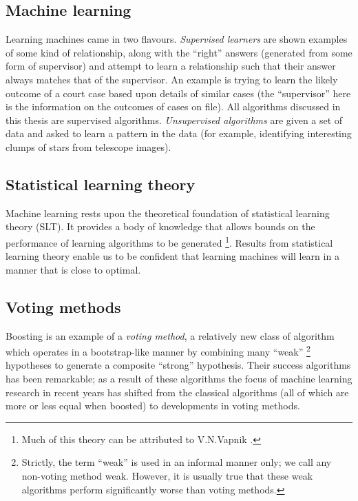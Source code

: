 \subsection{Machine learning}

Learning machines came in two flavours.  \emph{Supervised learners} are
shown examples of some kind of relationship, along with the ``right''
answers (generated from some form of supervisor) and attempt to learn a
relationship such that their answer always matches that of the
supervisor.  An example is trying to learn the likely outcome of a
court case based upon details of similar cases (the ``supervisor''
here is the information on the outcomes of cases on file).  All
algorithms discussed in this thesis are supervised algorithms.
\emph{Unsupervised algorithms} are given a set of data and asked to
learn a pattern in the data (for example, identifying interesting
clumps of stars from telescope images).


\subsection{Statistical learning theory}

Machine learning rests upon the theoretical foundation of statistical
learning theory (SLT).  It provides a body of knowledge that allows
bounds on the performance of learning algorithms to be generated%
\footnote{Much of this theory can be attributed to V.N.Vapnik
\cite{Vapnik98}.}.
Results from statistical learning theory enable us to be confident
that learning machines will learn in a manner that is close to optimal.

\subsection{Voting methods}

Boosting is an example of a \emph{voting method}, a relatively new
class of algorithm which operates in a bootstrap-like 
manner by combining many ``weak''%
\footnote{Strictly, the term ``weak'' is used in an informal manner
only; we call any non-voting method weak.  However, it is usually true
that these weak algorithms perform significantly worse than voting
methods.}
hypotheses to generate a composite ``strong'' hypothesis.  Their success
algorithms has been remarkable; as a result of these algorithms the
focus of machine learning research in recent years has shifted from
the classical algorithms (all of which are more or less equal when
boosted) to developments in voting methods.

